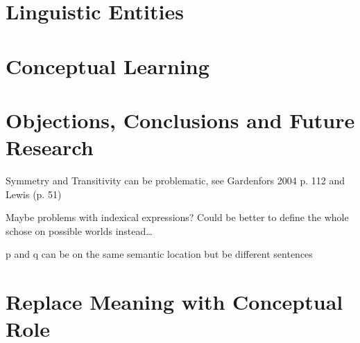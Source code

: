 \documentclass[11pt, a4paper]{scrartcl}
\begin{document}
\section{Linguistic Entities}
\section{Conceptual Learning}
\section{Objections, Conclusions and Future Research}
Symmetry and Transitivity can be problematic, see Gardenfors 2004 p. 112 and Lewis (p. 51)

Maybe problems with indexical expressions? Could be better to define the whole schose on possible worlds instead\ldots

p and q can be on the same semantic location but be different sentences
\section{Replace Meaning with Conceptual Role}
\nocite{*}
\printbibliography{}
\end{document}
